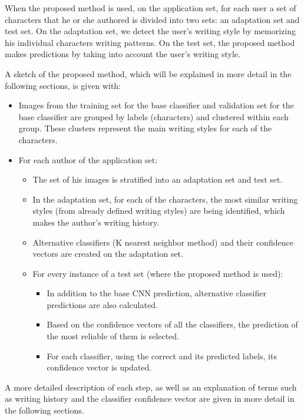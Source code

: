 \documentclass{article}
\begin{document}
When the proposed method is used, on the application set, for each user a set of characters that he or she authored is divided into two sets: an adaptation set and test set.
On the adaptation set, we detect the user's writing style by memorizing his individual characters writing patterns.
On the test set, the proposed method makes predictions by taking into account the user's writing style.

A sketch of the proposed method, which will be explained in more detail in the following sections, is given with:
\begin{itemize}
  \item Images from the training set for the base classifier and validation set for the base classifier are grouped by labels (characters) and clustered within each group.
  These clusters represent the main writing styles for each of the characters.
  \item For each author of the application set:
  \begin{itemize}
    \item The set of his images is stratified into an adaptation set and test set.
    \item In the adaptation set, for each of the characters, the most similar writing styles (from already defined writing styles) are being identified, which makes the author's writing history.
    \item Alternative classifiers (K nearest neighbor method) and their confidence vectors are created on the adaptation set.
    \item For every instance of a test set (where the proposed method is used):
      \begin{itemize}
        \item In addition to the base CNN prediction, alternative classifier predictions are also calculated.
        \item Based on the confidence vectors of all the classifiers, the prediction of the most reliable of them is selected.
        \item For each classifier, using the correct and its predicted labels, its confidence vector is updated.
      \end{itemize}
  \end{itemize}
\end{itemize}
A more detailed description of each step, as well as an explanation of terms such as writing history and the classifier confidence vector are given in more detail in the following sections.
\end{document}

